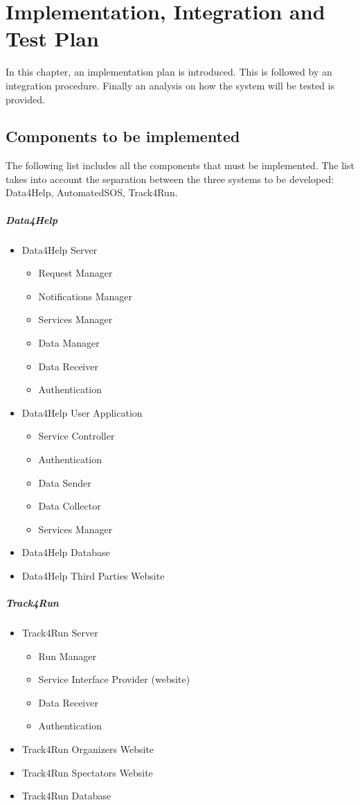 \documentclass[../DD.tex]{subfiles}
\begin{document}
\chapter{Implementation, Integration and Test Plan}
In this chapter, an implementation plan is introduced. This is followed by an integration procedure. Finally an analysis on how the system will be tested is provided.

\section{Components to be implemented\label{sect:5.1}}
The following list includes all the components that must be implemented. The list takes into account the separation between the three systems to be developed: Data4Help, AutomatedSOS, Track4Run.
\paragraph{Data4Help}
\begin{itemize}
	\item{Data4Help Server}
	\begin{itemize}
		\item{Request Manager}
		\item{Notifications Manager}
		\item{Services Manager}
		\item{Data Manager}
		\item{Data Receiver}
		\item{Authentication}
	\end{itemize}
	\item{Data4Help User Application}
	\begin{itemize}
		\item{Service Controller}
		\item{Authentication}
		\item{Data Sender}
		\item{Data Collector}
		\item{Services Manager}
	\end{itemize}
	\item{Data4Help Database}
	\item{Data4Help Third Parties Website}
\end{itemize}
\paragraph{Track4Run}
\begin{itemize}
	\item{Track4Run Server}
	\begin{itemize}
		\item{Run Manager}
		\item{Service Interface Provider (website)}
		\item{Data Receiver}
		\item{Authentication}
	\end{itemize}
	\item{Track4Run Organizers Website}
	\item{Track4Run Spectators Website}
	\item{Track4Run Database}
\end{itemize}
\end{document}
